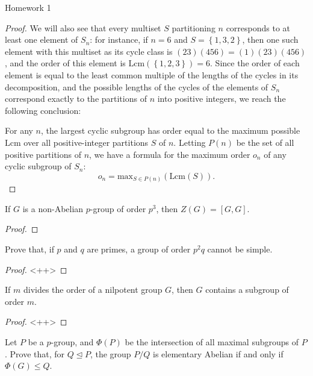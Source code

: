 \documentclass[12pt]{article}
\theoremstyle{definition}
\newenvironment{problem}[2][Problem]{\begin{trivlist}
\item[\hskip \labelsep {\bfseries #1}\hskip \labelsep {\bfseries #2.}]}{\end{trivlist}}
\begin{document}
\begin{section}{Homework 1}
\begin{problem}{2}
\begin{proof}
		\par We will also see that every multiset $S$ partitioning $n$ corresponds to at least one element of $S_n$: for instance, if $n=6$ and $S = \left\{ 1,3,2 \right\}$, then one such element with this multiset as its cycle class is $(23)(456) = (1)(23)(456)$, and the order of this element is $\text{Lcm}(\left\{ 1,2,3 \right\}) = 6$. 
		Since the order of each element is equal to the least common multiple of the lengths of the cycles in its decomposition, and the possible lengths of the cycles of the elements of $S_n$ correspond exactly to the partitions of $n$ into positive integers, we reach the following conclusion:
		\par For any $n$, the largest cyclic subgroup has order equal to the maximum possible $\text{Lcm}$ over all positive-integer partitions $S$ of $n$. Letting $P(n)$ be the set of all positive partitions of $n$, we have a formula for the maximum order $o_n$ of any cyclic subgroup of $S_n$:
		\[o_n = \text{max}_{S \in P(n)} (\text{Lcm}(S)).\]
	\end{proof}
\end{problem}
\begin{problem}{4}
	If $G$ is a non-Abelian $p$-group of order $p^3$, then $Z(G) = [G,G]$.
	\begin{proof}
		
	\end{proof}
\end{problem}

\begin{problem}{7}
	Prove that, if $p$ and $q$ are primes, a group of order $p^2 q$ cannot be simple.
	\begin{proof}
		<++>
	\end{proof}
\end{problem}
\begin{problem}{15}
	If $m$ divides the order of a nilpotent group $G$, then $G$ contains a subgroup of order $m$.
	\begin{proof}
		<++>
	\end{proof}
\end{problem}
\begin{problem}{19}
	Let $P$ be a $p$-group, and $\Phi(P)$ be the intersection of all maximal subgroups of $P$. Prove that, for $Q \trianglelefteq P$, the group $P/Q$ is elementary Abelian if and only if $\Phi(G) \leq Q$.
\end{problem}
\end{section}
\end{document}
